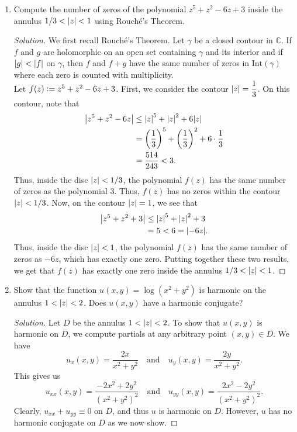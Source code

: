 \documentclass[11pt]{article}
\theoremstyle{definition}
\newenvironment{soln}{\begin{proof}[Solution]}{\end{proof}}
\begin{document}
\begin{enumerate}[leftmargin=*]
\begin{soln}
    \end{soln}
    
    \item Compute the number of zeros of the polynomial $z^5 + z^2 - 6z + 3$ inside the annulus $1/3 < \abs{z} < 1$ using Rouché's Theorem.
    
    \begin{soln}
        We first recall Rouché's Theorem. Let $\gamma$ be a closed contour in $\mathbb{C}$. If $f$ and $g$ are holomorphic on an open set containing $\gamma$ and its interior and if $\abs{g} < \abs{f}$ on $\gamma$, then $f$ and $f+g$ have the same number of zeros in $\text{Int}(\gamma)$ where each zero is counted with multiplicity. \\
        Let $f(z) \vcentcolon= z^5 + z^2 - 6z + 3$. First, we consider the contour $\abs{z} = \dfrac{1}{3}$. On this contour, note that
        \begin{align*}
            \abs{z^5 + z^2 - 6z} &\leq \abs{z}^5 + \abs{z}^2 + 6\abs{z} \\
            &= \left( \frac{1}{3} \right)^5 + \left( \frac{1}{3} \right)^2 + 6\cdot\frac{1}{3} \\
            &= \frac{514}{243} < 3.
        \end{align*}
            Thus, inside the disc $\abs{z} < 1/3$, the polynomial $f(z)$ has the same number of zeros as the polynomial $3$. Thus, $f(z)$ has no zeros within the contour $\abs{z} < 1/3$. Now, on the contour $\abs{z} = 1$, we see that
            \begin{align*}
                \abs{z^5 + z^2 + 3} &\leq \abs{z}^5 + \abs{z}^2 + 3 \\
                &= 5 < 6 = \abs{-6z}.
            \end{align*}
            Thus, inside the disc $\abs{z} < 1$, the polynomial $f(z)$ has the same number of zeros as $-6z$, which has exactly one zero. Putting together these two results, we get that $f(z)$ has exactly one zero inside the annulus $1/3 < \abs{z} < 1$.
    \end{soln}

    \item Show that the function $u(x,y) = \log(x^2+y^2)$ is harmonic on the annulus $1 < \abs{z} < 2$. Does $u(x,y)$ have a harmonic conjugate?
    
    \begin{soln}
        Let $D$ be the annulus $1 < \abs{z} < 2$. To show that $u(x,y)$ is harmonic on $D$, we compute partials at any arbitrary point $(x,y) \in D$. We have
        \[
            u_x(x,y) = \frac{2x}{x^2 + y^2} \quad \text{and} \quad u_y(x,y) = \frac{2y}{x^2 + y^2}.
        \]
        This gives us
        \[
            u_{xx}(x,y) = \frac{-2x^2 + 2y^2}{(x^2 + y^2)^2} \quad \text{and} \quad u_{yy}(x,y) = \frac{2x^2 - 2y^2}{(x^2+y^2)^2}.
        \]
        Clearly, $u_{xx} + u_{yy} \equiv 0$ on $D$, and thus $u$ is harmonic on $D$. However, $u$ has no harmonic conjugate on $D$ as we now show.
        

\end{soln}
\end{enumerate}
\end{document}

